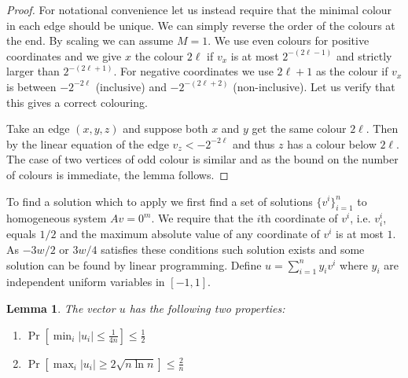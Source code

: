 \documentclass[a4paper,11pt]{article}
\theoremstyle{plain}
\newtheorem{lemma}[theorem]{Lemma}
\theoremstyle{definition}
\begin{document}
\begin{proof} For notational convenience let us instead require that the
minimal colour in each edge should be unique. We can simply reverse
the order of the colours at the end.  By scaling we can assume $M=1$.
We use even colours for positive coordinates and we
give $x$ the colour $2\ell$ if $v_x$ is at most $2^{-(2\ell-1)}$
and strictly larger than $2^{-(2\ell+1)}$.
For negative coordinates we use $2\ell+1$ as
the colour if $v_x$ is between $-2^{-2\ell}$ (inclusive)
and $-2^{-(2\ell+2)}$ (non-inclusive).
Let us verify that this gives a correct
colouring.

Take an edge $(x,y,z)$ and suppose both $x$ and $y$
get the same colour $2\ell$.   Then by the linear equation of the edge $v_z < -2^{-2\ell}$ and thus $z$ has a colour below $2\ell$.  The case
of two vertices of odd colour is similar and as the bound on the number of colours is immediate, the lemma follows.
\end{proof}

To find a solution which to apply  we first find a set of solutions $\{v^i\}_{i=1}^{n}$ to homogeneous system $Av=0^m$.  We require that the $i$th coordinate of $v^i$, i.e. $v^i_i$, equals $1/2$ and the maximum absolute value of any coordinate of $v^i$ is at most $1$. As $-3w/2$ or $3w/4$ satisfies these conditions such solution exists and some solution can be found by linear programming.  Define $u = \sum_{i=1}^{n} y_i v^i$ where $y_i$ are independent uniform variables in $[-1,1]$. 

\begin{lemma}
The vector $u$ has the following two properties:
\begin{enumerate}
    \item $\Pr[\min_i |u_i| \leq \frac{1}{4 n}] \leq \frac{1}{2}$

    \item $\Pr[\max_i |u_i| \geq 2 \sqrt{n \ln{n}}] \leq \frac{2}{n}$
\end{enumerate}
\end{lemma}
\end{document}
